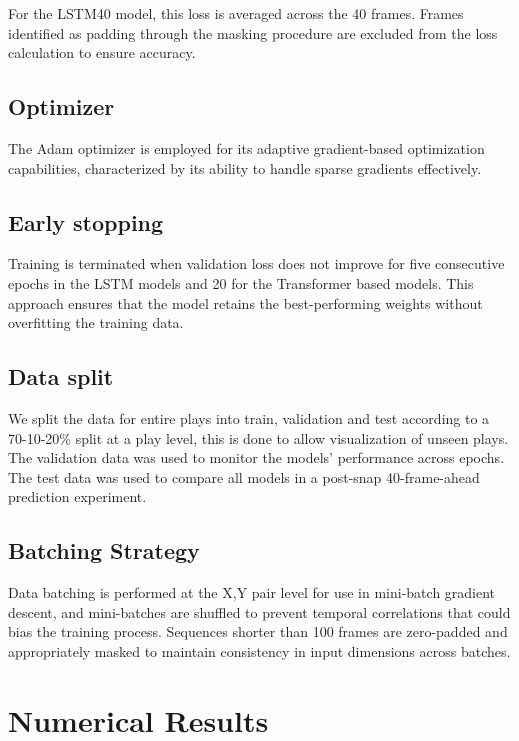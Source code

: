 \documentclass[sigconf]{acmart}
\begin{document}
For the LSTM40 model, this loss is averaged across the 40 frames. Frames identified as padding through the masking procedure are excluded from the loss calculation to ensure accuracy.

\subsection{Optimizer}

The Adam optimizer is employed for its adaptive gradient-based optimization capabilities, characterized by its ability to handle sparse gradients effectively.

\subsection{Early stopping}

Training is terminated when validation loss does not improve for five consecutive epochs in the LSTM models and 20 for the Transformer based models. This approach ensures that the model retains the best-performing weights without overfitting the training data.

\subsection{Data split}

We split the data for entire plays into train, validation and test according to a 70-10-20\% split at a play level, this is done to allow visualization of unseen plays. The validation data was used to monitor the models' performance across epochs. The test data was used to compare all models in a post-snap 40-frame-ahead prediction experiment. 

\subsection{Batching Strategy}

Data batching is performed at the X,Y pair level for use in mini-batch gradient descent, and mini-batches are shuffled to prevent temporal correlations that could bias the training process. Sequences shorter than 100 frames are zero-padded and appropriately masked to maintain consistency in input dimensions across batches.

\section{Numerical Results}
\end{document}
